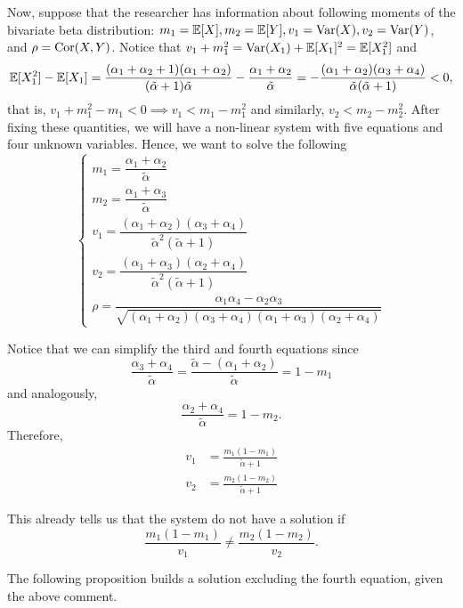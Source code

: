 Now, suppose that the researcher has information about following moments of
the bivariate beta distribution: $m_1 = \mathbb{E}[X], m_2 = \mathbb{E}[Y], v_1 = \operatorname{Var}(X),
v_2 = \operatorname{Var}(Y)$, and $\rho  = \operatorname{Cor}(X,Y)$. Notice that $v_1 + m_1^2 = \operatorname{Var}(X_1)
+ \mathbb{E}[X_1]^2 = \mathbb{E}[X_1^2]$ and
$$
\mathbb{E}[X_1^2] - \mathbb{E}[X_1] = \frac{(\alpha_1 + \alpha_2 + 1)(\alpha_1 + \alpha_2)}{(\tilde{\alpha} + 1)\tilde{\alpha}} - \frac{\alpha_1 + \alpha_2}{\tilde{\alpha}} = -\frac{(\alpha_1 + \alpha_2)(\alpha_3 + \alpha_4)}{\tilde{\alpha}(\tilde{\alpha}+1)} < 0, 
$$
that is, $v_1 + m_1^2 - m_1 < 0 \implies v_1 < m_1 - m_1^2$ and similarly,
$v_2 < m_2 - m_2^2$. After fixing these quantities, we will have a non-linear system with five equations and four
unknown variables. Hence, we want to solve the following 
\begin{equation}
  \label{eq:system-moments-alpha}
  \begin{cases}
    m_1 = \dfrac{\alpha_1+\alpha_2}{\tilde{\alpha}} \\
    m_2 = \dfrac{\alpha_1+\alpha_3}{\tilde{\alpha}} \\ 
    v_1 = \dfrac{(\alpha_1+\alpha_2)(\alpha_3+\alpha_4)}{\tilde{\alpha}^2(\tilde{\alpha}+1)} \\
    v_2 = \dfrac{(\alpha_1+\alpha_3)(\alpha_2+\alpha_4)}{\tilde{\alpha}^2(\tilde{\alpha}+1)} \\
    \rho = \dfrac{\alpha_1\alpha_4 - \alpha_2\alpha_3}{\sqrt{(\alpha_1+\alpha_2)(\alpha_3+\alpha_4)(\alpha_1+\alpha_3)(\alpha_2+\alpha_4)}}
  \end{cases}
\end{equation}

Notice that we can simplify the third and fourth equations since 
$$
\frac{\alpha_3 + \alpha_4}{\tilde{\alpha}} = \frac{\tilde{\alpha} - (\alpha_1 + \alpha_2)}{\tilde{\alpha}} = 1 - m_1 
$$
and analogously, 
$$
\frac{\alpha_2 + \alpha_4}{\tilde{\alpha}} = 1 - m_2. 
$$
Therefore, 
\begin{align*}
    v_1 &= \frac{m_1(1 - m_1)}{\tilde{\alpha} + 1} \\
    v_2 &= \frac{m_2(1 - m_2)}{\tilde{\alpha} + 1}
\end{align*}

This already tells us that the system do not have a solution if 
$$
\frac{m_1(1-m_1)}{v_1} \neq \frac{m_2(1-m_2)}{v_2}. 
$$

The following proposition builds a solution excluding the fourth equation, given the above comment. 

